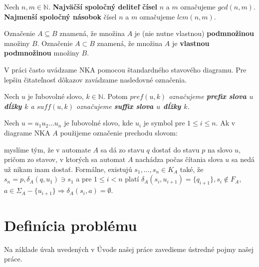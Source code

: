 \begin{notation}
Nech $ n,m \in \mathbb{N} $. \textbf{Najväčší spoločný deliteľ čísel} $ n $ a $ m $ označujeme $ gcd(n,m) $. \textbf{Najmenší spoločný násobok} čísel $ n $ a $ m $ označujeme $ lcm(n,m) $.
\end{notation}

\begin{notation}
Označenie $ A \subseteq B $ znamená, že množina $ A $ je (nie nutne vlastnou) \textbf{podmnožinou} množiny $ B $. Označenie $ A \subset B $ znamená, že množina $ A $ je \textbf{vlastnou podmnožinou} množiny $ B $.
\end{notation}


V práci často uvádzame NKA pomocou štandardného stavového diagramu. Pre lepšiu čitateľnosť dôkazov zavádzame nasledovné označenia.

\begin{notation}
Nech $ u $ je ľubovolné slovo, $ k \in \mathbb{N} $. Potom \em{}$ pref(u,k) $\em{} označujeme \textbf{prefix slova $ u $ dĺžky $ k $} a \em{}$ suff(u,k) $\em{} označujeme \textbf{suffix slova $ u $ dĺžky $ k $}.
\end{notation}

\begin{notation}
Nech $ u = u_1u_2 \ldots u_n$ je ľubovolné slovo, kde $ u_i $ je symbol pre $ 1 \leq i \leq n $. Ak v diagrame NKA $ A $ použijeme označenie prechodu slovom:
\begin{figure}[H]
\centering
{}
\end{figure}

myslíme tým, že v automate $ A $ sa dá zo stavu $ q $ dostať do stavu $ p $ na slovo $ u $, pričom zo stavov, v ktorých sa automat $ A $ nachádza počas čítania slova $ u $ sa nedá už nikam inam dostať. Formálne, existujú $ s_1, \ldots, s_n \in K_A $ také, že $ s_n = p, \delta_A(q, u_1) \ni s_1 $ a pre $ 1 \leq i < n $ platí $ \delta_A(s_i,u_{i+1}) = \lbrace q_{i+1} \rbrace, s_i \notin F_A $, $ a \in \Sigma_A - \lbrace u_{i+1} \rbrace \Rightarrow \delta_A(s_i,a) = \emptyset  $.
\end{notation}

\section{Definícia problému}
Na základe úvah uvedených v Úvode našej práce zavedieme ústredné pojmy našej práce.

